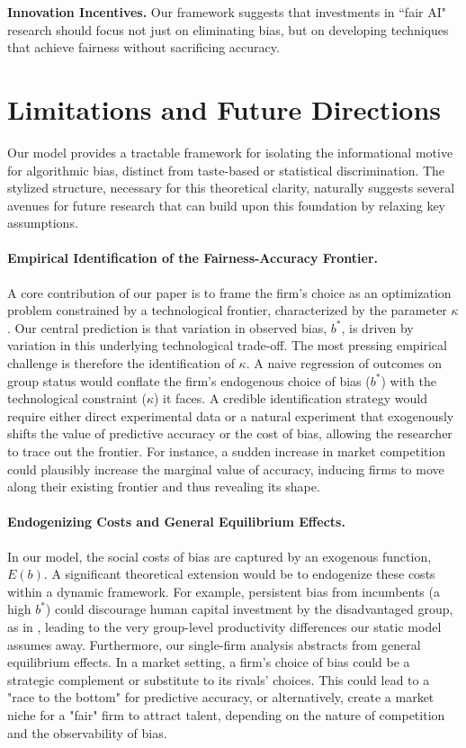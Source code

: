 \documentclass[12pt,a4paper]{article}
\theoremstyle{definition}
\theoremstyle{remark}
\begin{document}
\textbf{Innovation Incentives.} Our framework suggests that investments in ``fair AI" research should focus not just on eliminating bias, but on developing techniques that achieve fairness without sacrificing accuracy.

\section{Limitations and Future Directions}

Our model provides a tractable framework for isolating the informational motive for algorithmic bias, distinct from taste-based or statistical discrimination. The stylized structure, necessary for this theoretical clarity, naturally suggests several avenues for future research that can build upon this foundation by relaxing key assumptions.

\paragraph{Empirical Identification of the Fairness-Accuracy Frontier.}
A core contribution of our paper is to frame the firm's choice as an optimization problem constrained by a technological frontier, characterized by the parameter $\kappa$. Our central prediction is that variation in observed bias, $b^*$, is driven by variation in this underlying technological trade-off. The most pressing empirical challenge is therefore the identification of $\kappa$. A naive regression of outcomes on group status would conflate the firm's endogenous choice of bias ($b^*$) with the technological constraint ($\kappa$) it faces. A credible identification strategy would require either direct experimental data or a natural experiment that exogenously shifts the value of predictive accuracy or the cost of bias, allowing the researcher to trace out the frontier. For instance, a sudden increase in market competition could plausibly increase the marginal value of accuracy, inducing firms to move along their existing frontier and thus revealing its shape.

\paragraph{Endogenizing Costs and General Equilibrium Effects.}
In our model, the social costs of bias are captured by an exogenous function, $E(b)$. A significant theoretical extension would be to endogenize these costs within a dynamic framework. For example, persistent bias from incumbents (a high $b^*$) could discourage human capital investment by the disadvantaged group, as in \citep{CoateLoury1993}, leading to the very group-level productivity differences our static model assumes away. Furthermore, our single-firm analysis abstracts from general equilibrium effects. In a market setting, a firm's choice of bias could be a strategic complement or substitute to its rivals' choices. This could lead to a "race to the bottom" for predictive accuracy, or alternatively, create a market niche for a "fair" firm to attract talent, depending on the nature of competition and the observability of bias.
\end{document}
